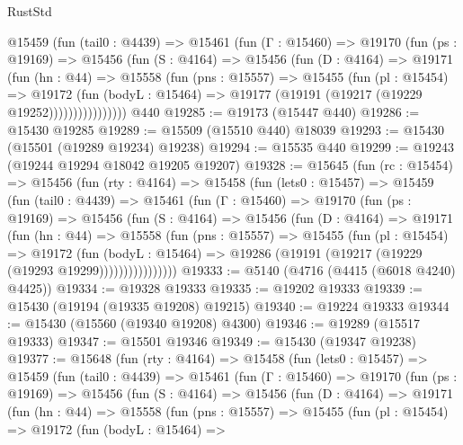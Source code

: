 \begin{lexlean}{RustStd}
\begin{coremodule}
{\begin{coremodule}
{{{{{{{{{{{{{{{{{{{{{{{{{{{{{{{{{{{{{{{{{{{{{{{{{{{{{{{{{{{{          @15459
            (fun (tail0 : @4439) =>
            @15461
              (fun (Γ : @15460) =>
              @19170
                (fun (ps : @19169) =>
                @15456
                  (fun (S : @4164) =>
                  @15456
                    (fun (D : @4164) =>
                    @19171
                      (fun (hn : @44) =>
                      @15558
                        (fun (pns : @15557) =>
                        @15455
                          (fun (pl : @15454) =>
                          @19172
                            (fun (bodyL : @15464) =>
                            @19177 (@19191 (@19217 (@19229 @19252))))))))))))))))
    @440
@19285 := @19173 (@15447 @440)
@19286 := @15430 @19285
@19289 := @15509 (@15510 @440) @18039
@19293 := @15430 (@15501 (@19289 @19234) @19238)
@19294 := @15535 @440
@19299 := @19243 (@19244 @19294 @18042 @19205 @19207)
@19328 := @15645
    (fun (rc : @15454) =>
    @15456
      (fun (rty : @4164) =>
      @15458
        (fun (lets0 : @15457) =>
        @15459
          (fun (tail0 : @4439) =>
          @15461
            (fun (Γ : @15460) =>
            @19170
              (fun (ps : @19169) =>
              @15456
                (fun (S : @4164) =>
                @15456
                  (fun (D : @4164) =>
                  @19171
                    (fun (hn : @44) =>
                    @15558
                      (fun (pns : @15557) =>
                      @15455
                        (fun (pl : @15454) =>
                        @19172
                          (fun (bodyL : @15464) =>
                          @19286 (@19191 (@19217 (@19229 (@19293 @19299))))))))))))))))
@19333 := @5140 (@4716 (@4415 (@6018 @4240) @4425))
@19334 := @19328 @19333
@19335 := @19202 @19333
@19339 := @15430 (@19194 (@19335 @19208) @19215)
@19340 := @19224 @19333
@19344 := @15430 (@15560 (@19340 @19208) @4300)
@19346 := @19289 (@15517 @19333)
@19347 := @15501 @19346
@19349 := @15430 (@19347 @19238)
@19377 := @15648
    (fun (rty : @4164) =>
    @15458
      (fun (lets0 : @15457) =>
      @15459
        (fun (tail0 : @4439) =>
        @15461
          (fun (Γ : @15460) =>
          @19170
            (fun (ps : @19169) =>
            @15456
              (fun (S : @4164) =>
              @15456
                (fun (D : @4164) =>
                @19171
                  (fun (hn : @44) =>
                  @15558
                    (fun (pns : @15557) =>
                    @15455
                      (fun (pl : @15454) =>
                      @19172
                        (fun (bodyL : @15464) =>
}}}}}}}}}}}}}}}}}}}}}}}}}}}}}}}}}}}}}}}}}}}}}}}}}}}}}}}}}}}}
\end{coremodule}}
\end{coremodule}
\end{lexlean}
